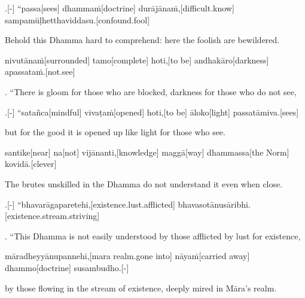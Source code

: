 \begin{samepage}
.[-] “passa[sees] dhammaṁ[doctrine] durājānaṁ,[difficult.know] sampamūḷhetthaviddasu.[confound.fool]
\endgl
\nopagebreak
\linespread{0.5}
\begin{spacin}{0.2}
{\PaliGlossFT Behold this Dhamma hard to comprehend: here the foolish are bewildered.}
\end{spacin}
\vskip 12pt
\end{samepage}
\begin{samepage}
\begingl[glneveryline={\PaliGlossA,\PaliGlossB}]
nivutānaṁ[surrounded] tamo[complete] hoti,[to be] andhakāro[darkness] apassataṁ.[not.see]
\endgl
\nopagebreak
\linespread{0.5}
\begin{spacin}{0.2}
{. “There is gloom for those who are blocked, darkness for those who do not see,}
\end{spacin}
\vskip 12pt
\end{samepage}
\begin{samepage}
.[-] “satañca[mindful] vivaṭaṁ[opened] hoti,[to be] āloko[light] passatāmiva.[sees]
\endgl
\nopagebreak
\linespread{0.5}
\begin{spacin}{0.2}
{\PaliGlossFT but for the good it is opened up like light for those who see.}
\end{spacin}
\vskip 12pt
\end{samepage}
\begin{samepage}
\begingl[glneveryline={\PaliGlossA,\PaliGlossB}]
santike[near] na[not] vijānanti,[knowledge] maggā[way] dhammassa[the Norm] kovidā.[clever]
\endgl
\nopagebreak
\linespread{0.5}
\begin{spacin}{0.2}
{\PaliGlossFT The brutes unskilled in the Dhamma do not understand it even when close.}
\end{spacin}
\vskip 12pt
\end{samepage}
\begin{samepage}
.[-] “bhavarāgaparetehi,[existence.lust.afflicted] bhavasotānusāribhi.[existence.stream.striving]
\endgl
\nopagebreak
\linespread{0.5}
\begin{spacin}{0.2}
{. “This Dhamma is not easily understood by those afflicted by lust for existence,}
\end{spacin}
\vskip 12pt
\end{samepage}
\begin{samepage}
\begingl[glneveryline={\PaliGlossA,\PaliGlossB}]
māradheyyānupannehi,[mara realm.gone into] nāyaṁ[carried away] dhammo[doctrine] susambudho.[-]
\endgl
\nopagebreak
\linespread{0.5}
\begin{spacin}{0.2}
{\PaliGlossFT by those flowing in the stream of existence, deeply mired in Māra’s realm.}
\end{spacin}
\vskip 12pt
\end{samepage}
